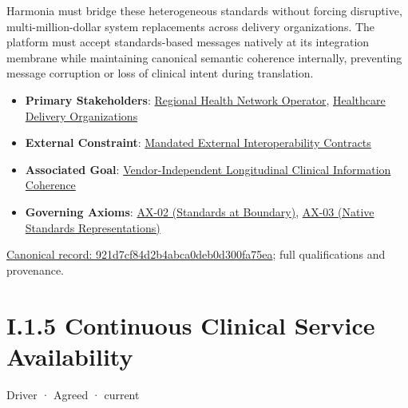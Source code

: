 Harmonia must bridge these heterogeneous standards without forcing disruptive, multi-million-dollar system replacements across delivery organizations. The platform must accept standards-based messages natively at its integration membrane while maintaining canonical semantic coherence internally, preventing message corruption or loss of clinical intent during translation.



\begin{itemize}


\item \textbf{Primary Stakeholders}: \href{\detokenize{../../../../../docs/markdown/01-motivation/stakeholders/enterprise-stakeholders.md}}{Regional Health Network Operator}, \href{\detokenize{../../../../../docs/markdown/01-motivation/stakeholders/enterprise-stakeholders.md}}{Healthcare Delivery Organizations}

\item \textbf{External Constraint}: \href{\detokenize{../../../../../docs/markdown/01-motivation/requirements-constraints/external-constraints.md}}{Mandated External Interoperability Contracts}

\item \textbf{Associated Goal}: \href{\detokenize{../../../../../docs/markdown/01-motivation/goals-outcomes/strategic-goals.md}}{Vendor-Independent Longitudinal Clinical Information Coherence}

\item \textbf{Governing Axioms}: \hyperref[element:eee8c3783d964d18a7f9dcea85fcd4cf]{AX-02 (Standards at Boundary)}, \hyperref[element:e99a4e2bf99f476d876394300d6b9c3d]{AX-03 (Native Standards Representations)}

\end{itemize}

{\footnotesize \href{../../../../continuum/motivation/driver/921d7cf84d2b4abca0deb0d300fa75ea.md}{Canonical record: 921d7cf84d2b4abca0deb0d300fa75ea}; full qualifications and provenance.}\par
\section*{I.1.5 Continuous Clinical Service Availability}
\label{navigation:I.1.5}

\label{element:80e2d5f142da4dae8b7bb70e9ddcab06}
{\small Driver · Agreed · current}\par

